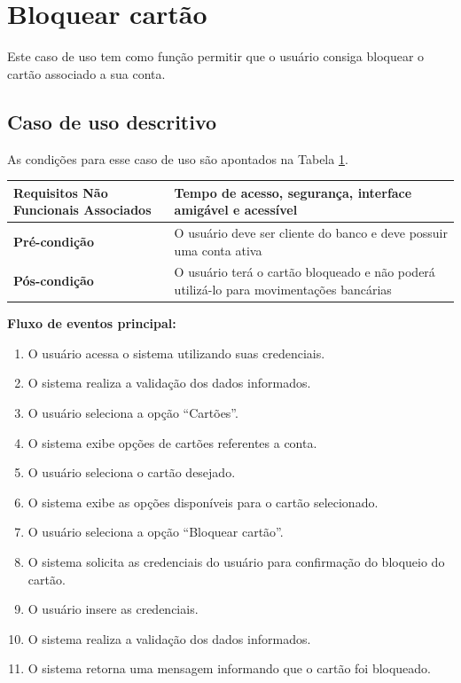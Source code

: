 \section{Bloquear cartão}

Este caso de uso tem como função permitir que o usuário consiga bloquear o cartão associado a sua conta.

\subsection{Caso de uso descritivo}

As condições para esse caso de uso são apontados na Tabela \ref{tab:bloquearCartao}.

\begin{table}[h]
  \centering
  \begin{tabular}{|p{4cm} | p{10cm} |}
      \hline
      \small{\textbf{Requisitos Não Funcionais Associados}}	&	Tempo de acesso, segurança, interface amigável e acessível	\\ \hline
      \small{\textbf{Pré-condição}}	&	O usuário deve ser cliente do banco e deve possuir uma conta ativa	\\ \hline
      \small{\textbf{Pós-condição}}	&	O usuário terá o cartão bloqueado e não poderá utilizá-lo para movimentações bancárias	\\ \hline
    \end{tabular}
 \label{tab:bloquearCartao}
\end{table}

\textbf{Fluxo de eventos principal:}

\begin{enumerate}
  \item O usuário acessa o sistema utilizando suas credenciais.
  \item O sistema realiza a validação dos dados informados.
  \item O usuário seleciona a opção ``Cartões''.
  \item O sistema exibe opções de cartões referentes a conta.
  \item O usuário seleciona o cartão desejado.
  \item O sistema exibe as opções disponíveis para o cartão selecionado.
  \item O usuário seleciona a opção ``Bloquear cartão''.
  \item O sistema solicita as credenciais do usuário para confirmação do bloqueio do cartão.
  \item O usuário insere as credenciais.
  \item O sistema realiza a validação dos dados informados.
  \item O sistema retorna uma mensagem informando que o cartão foi bloqueado.
\end{enumerate}

